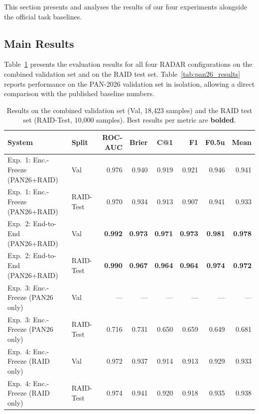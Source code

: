 This section presents and analyses the results of our four experiments alongside
the official task baselines.

\subsection{Main Results}

Table~\ref{tab:main_results} presents the evaluation results for all four RADAR
configurations on the combined validation set and on the RAID test set.
Table~\ref{tab:pan26_results} reports performance on the PAN-2026 validation set
in isolation, allowing a direct comparison with the published baseline numbers.

\begin{table}[t]
\caption{Results on the combined validation set (Val, 18,423 samples) and the
  RAID test set (RAID-Test, 10,000 samples). Best results per metric are \textbf{bolded}.}
\label{tab:main_results}
\begin{tabular}{llrrrrrr}
\toprule
\textbf{System} & \textbf{Split} & \textbf{ROC-AUC} & \textbf{Brier} & \textbf{C@1} & \textbf{F1} & \textbf{F0.5u} & \textbf{Mean} \\
\midrule
Exp.~1: Enc.-Freeze (PAN26+RAID)   & Val       & 0.976 & 0.940 & 0.919 & 0.921 & 0.946 & 0.941 \\
Exp.~1: Enc.-Freeze (PAN26+RAID)   & RAID-Test & 0.970 & 0.934 & 0.913 & 0.907 & 0.941 & 0.933 \\
\midrule
Exp.~2: End-to-End (PAN26+RAID)    & Val       & \textbf{0.992} & \textbf{0.973} & \textbf{0.971} & \textbf{0.973} & \textbf{0.981} & \textbf{0.978} \\
Exp.~2: End-to-End (PAN26+RAID)    & RAID-Test & \textbf{0.990} & \textbf{0.967} & \textbf{0.964} & \textbf{0.964} & \textbf{0.974} & \textbf{0.972} \\
\midrule
Exp.~3: Enc.-Freeze (PAN26 only)   & Val       & — & — & — & — & — & — \\
Exp.~3: Enc.-Freeze (PAN26 only)   & RAID-Test & 0.716 & 0.731 & 0.650 & 0.659 & 0.649 & 0.681 \\
\midrule
Exp.~4: Enc.-Freeze (RAID only)    & Val       & 0.972 & 0.937 & 0.914 & 0.913 & 0.929 & 0.933 \\
Exp.~4: Enc.-Freeze (RAID only)    & RAID-Test & 0.974 & 0.941 & 0.920 & 0.918 & 0.935 & 0.938 \\
\bottomrule
\end{tabular}
\end{table}

